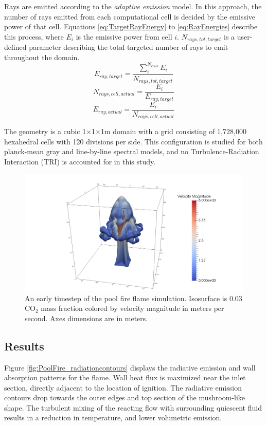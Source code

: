 Rays are emitted according to the \textit{adaptive emission} model. In this approach, the number of rays emitted from each computational cell is decided by the emissive power of that cell. Equations \ref{eq:TargetRayEnergy} to \ref{eq:RayEnergies} describe this process, where $E_i$ is the emissive power from cell $i$. 
$N_{rays,tot,target}$ is a user-defined parameter describing the total targeted number of rays to emit throughout the domain.
\begin{equation}
    E_{ray,target}=\frac{\sum^{N_{cells}}_{i}E_{i}}{N_{rays,tot,target}}
    \label{eq:TargetRayEnergy}
\end{equation}
\begin{equation}
    N_{rays,cell,actual}=\frac{E_{i}}{E_{ray,target}}
    \label{eq:NumberOfRays}
\end{equation}
\begin{equation}
    E_{ray,actual}=\frac{E_{i}}{N_{rays,cell,actual}}
    \label{eq:RayEnergies}
\end{equation}


The geometry is a cubic 1$\times$1$\times$1m domain with a grid consisting of 1,728,000 hexahedral cells with 120 divisions per side.
This configuration is studied for both planck-mean gray and line-by-line spectral models, and no Turbulence-Radiation Interaction (TRI) is accounted for in this study.

\begin{figure}
\includegraphics[width=\linewidth]{figures/ch4/contour_early.png}
\caption{An early timestep of the pool fire flame simulation. Isosurface is 0.03 CO$_2$ mass fraction colored by velocity magnitude in meters per second. Axes dimensions are in meters.}
\label{fig:PoolFire_diagram}
\end{figure}

\subsection{Results}
Figure \ref{fig:PoolFire_radiationcontours} displays the radiative emission and wall absorption patterns for the flame. Wall heat flux is maximized near the inlet section, directly adjacent to the location of ignition. 
The radiative emission contours drop towards the outer edges and top section of the mushroom-like shape. The turbulent mixing of the reacting flow with surrounding quiescent fluid results in a reduction in temperature, and lower volumetric emission.  

